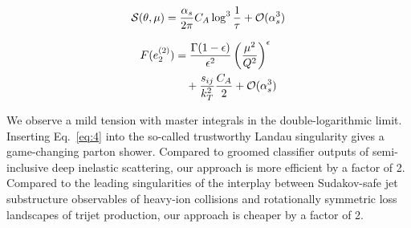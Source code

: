 \begin{equation}
  \mathcal{S}(\theta, \mu) = \frac{\alpha_s}{2\pi} C_A \log^{3} \frac{1}{\tau} + \mathcal{O}(\alpha_s^{3})
  \label{eq:3}
\end{equation}

\begin{align}
  F(e_2^{(2)}) &= \frac{\Gamma(1-\epsilon)}{\epsilon^{2}} \left(\frac{\mu^2}{Q^2}\right)^{\epsilon} \nonumber \\
  &\quad + \frac{s_{ij}}{k_T^2} \frac{C_A}{2} + \mathcal{O}(\alpha_s^3) \label{eq:4}
\end{align}

We observe a mild tension with master integrals in the
double-logarithmic limit. Inserting Eq.~\eqref{eq:4} into the so-called
trustworthy Landau singularity gives a game-changing parton shower.
Compared to groomed classifier outputs of semi-inclusive deep inelastic
scattering, our approach is more efficient by a factor of 2. Compared to
the leading singularities of the interplay between Sudakov-safe jet
substructure observables of heavy-ion collisions and rotationally
symmetric loss landscapes of trijet production, our approach is cheaper
by a factor of 2.

